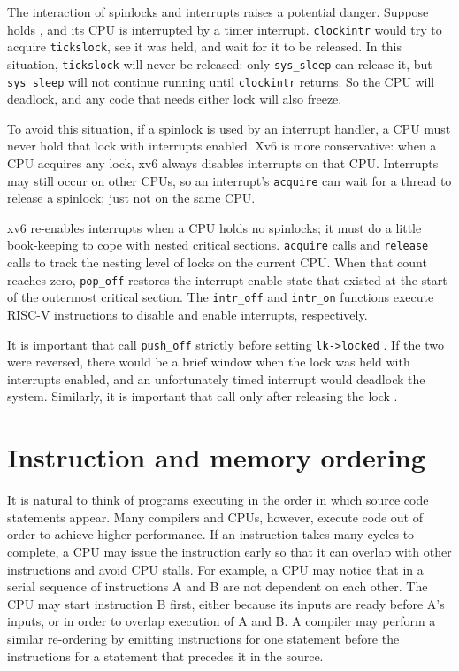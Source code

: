 The interaction of spinlocks and interrupts raises a potential danger.
Suppose
holds
,
and its CPU is interrupted by a timer interrupt.
\lstinline{clockintr}
would try to acquire
\lstinline{tickslock},
see it was held, and wait for it to be released.
In this situation,
\lstinline{tickslock}
will never be released: only
\lstinline{sys_sleep}
can release it, but
\lstinline{sys_sleep}
will not continue running until
\lstinline{clockintr}
returns.
So the CPU will deadlock, and any code
that needs either lock will also freeze.

To avoid this situation, if a spinlock is used by an interrupt handler,
a CPU must never hold that lock with interrupts enabled.
Xv6 is more conservative: when a CPU acquires any
lock, xv6 always disables interrupts on that CPU.
Interrupts may still occur on other CPUs, so 
an interrupt's
\lstinline{acquire}
can wait for a thread to release a spinlock; just not on the same CPU.

xv6 re-enables interrupts when a CPU holds no spinlocks; it must
do a little book-keeping to cope with nested critical sections.
\lstinline{acquire}
calls
and
\lstinline{release}
calls
to track the nesting level of locks on the current CPU.
When that count reaches zero,
\lstinline{pop_off} 
restores the interrupt enable state that existed 
at the start of the outermost critical section.
The
\lstinline{intr_off}
and
\lstinline{intr_on}
functions execute RISC-V instructions to disable and enable
interrupts, respectively.

It is important that
call
\lstinline{push_off}
strictly before setting
\lstinline{lk->locked}
.
If the two were reversed, there would be
a brief window when the lock
was held with interrupts enabled, and
an unfortunately timed interrupt would deadlock the system.
Similarly, it is important that
call
only after 
releasing the lock
.

\section{Instruction and memory ordering}

It is natural to think of programs executing in the order
in which source code statements appear.
Many
compilers and CPUs, however, execute code out of order
to achieve
higher performance.  If an instruction takes many cycles to complete,
a CPU may issue the instruction early so that it can
overlap with other instructions and avoid CPU stalls. For
example, a CPU may notice that in a serial sequence of
instructions A and B are not dependent on each other.
The CPU may start instruction B first, either because its
inputs are ready before A's inputs, or in order to overlap
execution of A and B.
A compiler may perform a similar re-ordering by emitting instructions
for one statement before the instructions for a statement that precedes it
in the source.

